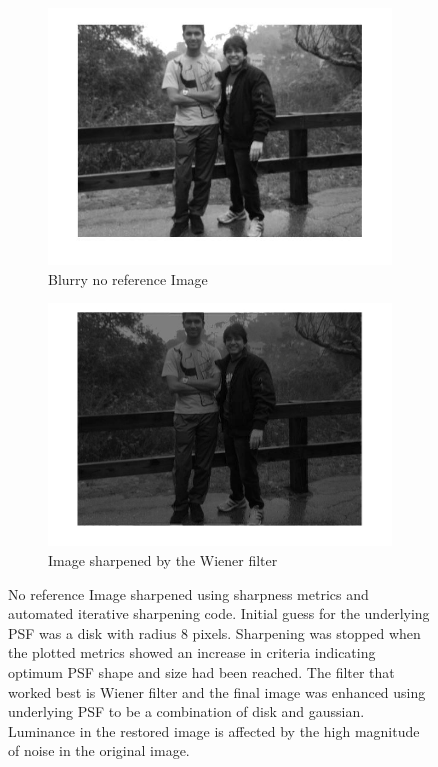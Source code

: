 \begin{figure}
        \centering
        \begin{subfigure}[b]{0.4\textwidth}
                \centering
                \includegraphics[width=\textwidth]{blur_personal.jpg}
                \caption{Blurry no reference Image}
               
        \end{subfigure}
        \begin{subfigure}[b]{0.4\textwidth}
                 \centering
                 \includegraphics[width=\textwidth]{sharp_personal_bright.jpg}
                 \caption{Image sharpened by the Wiener filter }
                       
        \end{subfigure}
              
        \caption{No reference Image sharpened using sharpness metrics and automated iterative sharpening code. Initial guess for the underlying PSF was a disk with radius 8 pixels. Sharpening was stopped when the plotted metrics showed an increase in criteria indicating optimum PSF shape and size had been reached. The filter that worked best is Wiener filter and the final image was enhanced using underlying PSF to be a combination of disk and gaussian. Luminance in the restored image is affected by the high magnitude of noise in the original image.} \label{fig:true_metrics}
\end{figure}



